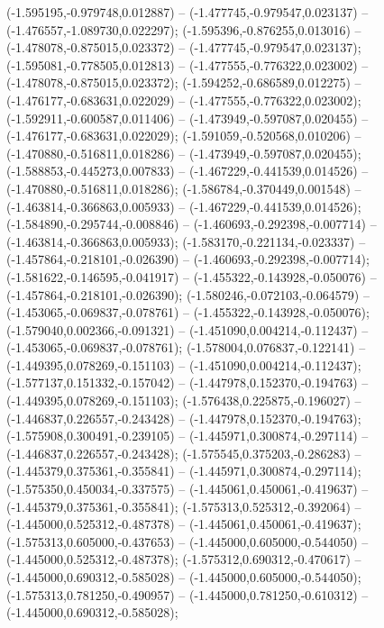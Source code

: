  (-1.595195,-0.979748,0.012887) -- (-1.477745,-0.979547,0.023137) -- (-1.476557,-1.089730,0.022297);
 (-1.595396,-0.876255,0.013016) -- (-1.478078,-0.875015,0.023372) -- (-1.477745,-0.979547,0.023137);
 (-1.595081,-0.778505,0.012813) -- (-1.477555,-0.776322,0.023002) -- (-1.478078,-0.875015,0.023372);
 (-1.594252,-0.686589,0.012275) -- (-1.476177,-0.683631,0.022029) -- (-1.477555,-0.776322,0.023002);
 (-1.592911,-0.600587,0.011406) -- (-1.473949,-0.597087,0.020455) -- (-1.476177,-0.683631,0.022029);
 (-1.591059,-0.520568,0.010206) -- (-1.470880,-0.516811,0.018286) -- (-1.473949,-0.597087,0.020455);
 (-1.588853,-0.445273,0.007833) -- (-1.467229,-0.441539,0.014526) -- (-1.470880,-0.516811,0.018286);
 (-1.586784,-0.370449,0.001548) -- (-1.463814,-0.366863,0.005933) -- (-1.467229,-0.441539,0.014526);
 (-1.584890,-0.295744,-0.008846) -- (-1.460693,-0.292398,-0.007714) -- (-1.463814,-0.366863,0.005933);
 (-1.583170,-0.221134,-0.023337) -- (-1.457864,-0.218101,-0.026390) -- (-1.460693,-0.292398,-0.007714);
 (-1.581622,-0.146595,-0.041917) -- (-1.455322,-0.143928,-0.050076) -- (-1.457864,-0.218101,-0.026390);
 (-1.580246,-0.072103,-0.064579) -- (-1.453065,-0.069837,-0.078761) -- (-1.455322,-0.143928,-0.050076);
 (-1.579040,0.002366,-0.091321) -- (-1.451090,0.004214,-0.112437) -- (-1.453065,-0.069837,-0.078761);
 (-1.578004,0.076837,-0.122141) -- (-1.449395,0.078269,-0.151103) -- (-1.451090,0.004214,-0.112437);
 (-1.577137,0.151332,-0.157042) -- (-1.447978,0.152370,-0.194763) -- (-1.449395,0.078269,-0.151103);
 (-1.576438,0.225875,-0.196027) -- (-1.446837,0.226557,-0.243428) -- (-1.447978,0.152370,-0.194763);
 (-1.575908,0.300491,-0.239105) -- (-1.445971,0.300874,-0.297114) -- (-1.446837,0.226557,-0.243428);
 (-1.575545,0.375203,-0.286283) -- (-1.445379,0.375361,-0.355841) -- (-1.445971,0.300874,-0.297114);
 (-1.575350,0.450034,-0.337575) -- (-1.445061,0.450061,-0.419637) -- (-1.445379,0.375361,-0.355841);
 (-1.575313,0.525312,-0.392064) -- (-1.445000,0.525312,-0.487378) -- (-1.445061,0.450061,-0.419637);
 (-1.575313,0.605000,-0.437653) -- (-1.445000,0.605000,-0.544050) -- (-1.445000,0.525312,-0.487378);
 (-1.575312,0.690312,-0.470617) -- (-1.445000,0.690312,-0.585028) -- (-1.445000,0.605000,-0.544050);
 (-1.575313,0.781250,-0.490957) -- (-1.445000,0.781250,-0.610312) -- (-1.445000,0.690312,-0.585028);
